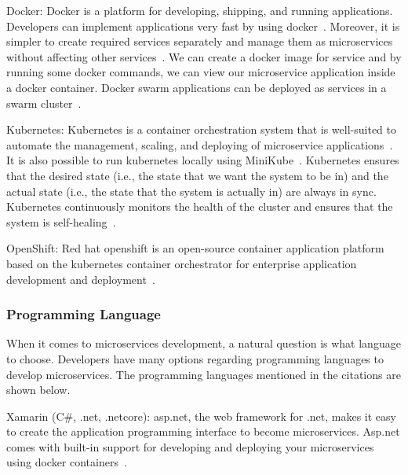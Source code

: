 \par Docker: Docker is a platform for developing, shipping, and running applications. Developers can implement applications very fast by using docker~\cite{Sharaf2019, Kristiani2020, khan2020}. Moreover, it is simpler to create required services separately and manage them as microservices without affecting other services~\cite{Leo2019, Hou2020, Kalske2017paper, Bahadori2018}. We can create a docker image for service and by running some docker commands, we can view our microservice application inside a docker container. Docker swarm applications can be deployed as services in a swarm cluster~\cite{Falatiuk2019, Venugopal2017, coulson2020}.
	
\par Kubernetes: Kubernetes is a container orchestration system that is well-suited to automate the management, scaling, and deploying of microservice applications~\cite{Zaytev2018, Kristiani2020, khan2020}. 
It is also possible to run kubernetes locally using MiniKube~\cite{Leo2019, Kalske2017paper}.
Kubernetes ensures that the desired state (i.e., the state that we want the system to be in) and the actual state (i.e., the state that the system is actually in) are always in sync. Kubernetes continuously monitors the health of the cluster and ensures that the system is self-healing~\cite{Bahadori2018, Falatiuk2019, Venugopal2017}.

\par OpenShift: Red hat openshift is an open-source container application platform based on the kubernetes container orchestrator for enterprise application development and deployment~\cite{Johansson2019, Bahadori2018}.


\subsubsection{Programming Language}
When it comes to microservices development, a natural question is what language to choose. Developers have many options regarding programming languages to develop microservices. The programming languages mentioned in the citations are shown below.

\par Xamarin (C\#, .net, .netcore): asp.net, the web framework for .net, makes it easy to create the application programming interface to become microservices. Asp.net comes with built-in support for developing and deploying your microservices using docker containers~\cite{liu2018, chauvel2018, haugeland2020, Johansson2019, neves2019, Falatiuk2019}.

